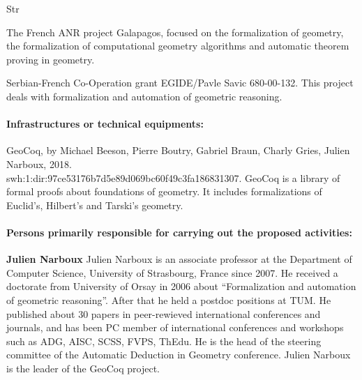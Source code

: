 \begin{sitedescription}{Str}
\begin{compactitem}
\item The French ANR project Galapagos, focused on the formalization of geometry, the formalization of computational geometry algorithms and automatic theorem proving in geometry.
\item Serbian-French Co-Operation grant EGIDE/Pavle Savic 680-00-132. This project deals with formalization and automation of geometric reasoning.
\end{compactitem}

\paragraph*{Infrastructures or technical equipments:}

\begin{compactitem}
\item GeoCoq, by Michael Beeson, Pierre Boutry, Gabriel Braun, Charly Gries, Julien Narboux, 2018.\\swh:1:dir:97ce53176b7d5e89d069bc60f49c3fa186831307. GeoCoq is a library of formal proofs about foundations of geometry. It includes formalizations of Euclid's, Hilbert's and Tarski's geometry.
\end{compactitem}

\paragraph*{Persons primarily responsible for carrying out the proposed activities:}

\begin{compactitem}
\item{\bf Julien Narboux}
Julien Narboux is an associate professor at the Department of Computer Science, University of Strasbourg, France since 2007. He received a doctorate from University of Orsay in 2006 about “Formalization and automation of geometric reasoning”. After that he held a postdoc positions at TUM.
He published about 30 papers in peer-rewieved international conferences and journals, and has been PC member of international conferences and workshops such as ADG, AISC, SCSS, FVPS, ThEdu. He is the head of the steering committee of the Automatic Deduction in Geometry conference. Julien Narboux is the leader of the GeoCoq project.


\end{compactitem}
\end{sitedescription}
